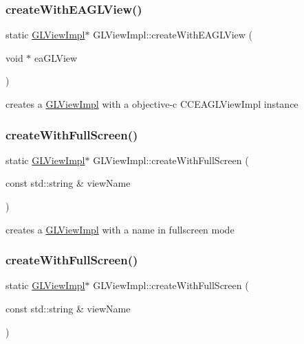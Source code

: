 \subsubsection{\texorpdfstring{create\+With\+E\+A\+G\+L\+View()}{createWithEAGLView()}\hspace{0.1cm}{\footnotesize\ttfamily [2/2]}}
{\footnotesize\ttfamily static \hyperlink{classGLViewImpl}{G\+L\+View\+Impl}$\ast$ G\+L\+View\+Impl\+::create\+With\+E\+A\+G\+L\+View (\begin{DoxyParamCaption}\item[{void $\ast$}]{ea\+G\+L\+View }\end{DoxyParamCaption})\hspace{0.3cm}{\ttfamily [static]}}

creates a \hyperlink{classGLViewImpl}{G\+L\+View\+Impl} with a objective-\/c C\+C\+E\+A\+G\+L\+View\+Impl instance \mbox{\label{classGLViewImpl_aca84dd242aa41c37bb47a196c2a8870b}} 
\subsubsection{\texorpdfstring{create\+With\+Full\+Screen()}{createWithFullScreen()}\hspace{0.1cm}{\footnotesize\ttfamily [1/2]}}
{\footnotesize\ttfamily static \hyperlink{classGLViewImpl}{G\+L\+View\+Impl}$\ast$ G\+L\+View\+Impl\+::create\+With\+Full\+Screen (\begin{DoxyParamCaption}\item[{const std\+::string \&}]{view\+Name }\end{DoxyParamCaption})\hspace{0.3cm}{\ttfamily [static]}}

creates a \hyperlink{classGLViewImpl}{G\+L\+View\+Impl} with a name in fullscreen mode \mbox{\label{classGLViewImpl_aca84dd242aa41c37bb47a196c2a8870b}} 
\subsubsection{\texorpdfstring{create\+With\+Full\+Screen()}{createWithFullScreen()}\hspace{0.1cm}{\footnotesize\ttfamily [2/2]}}
{\footnotesize\ttfamily static \hyperlink{classGLViewImpl}{G\+L\+View\+Impl}$\ast$ G\+L\+View\+Impl\+::create\+With\+Full\+Screen (\begin{DoxyParamCaption}\item[{const std\+::string \&}]{view\+Name }\end{DoxyParamCaption})\hspace{0.3cm}{\ttfamily [static]}}

